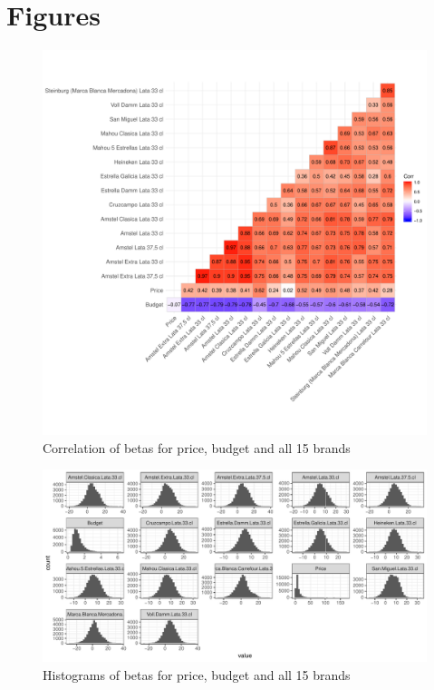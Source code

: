 \documentclass[12pt,a4paper]{article}
\begin{document}
\clearpage
\appendix
\section{Figures}

\begin{figure}[ht]
	\centering
  \includegraphics[scale = 0.5]{figures/corrplot_betas_full.pdf}
	\caption{Correlation of betas for price, budget and all 15 brands}
	\label{fig_corr_all}
\end{figure}

\begin{figure}[ht]
	\centering
  \includegraphics[scale = 0.6]{figures/hist_betas_full.pdf}
	\caption{Histograms of betas for price, budget and all 15 brands}
	\label{fig_hist_all}
\end{figure}
\end{document}
